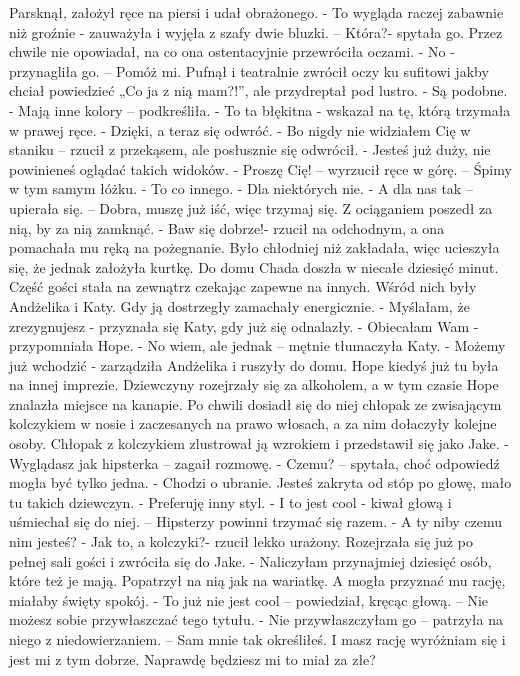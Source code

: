 \documentclass[12pt,a4paper]{book}
\begin{document}
Parsknął, założył ręce na piersi i udał obrażonego. 
- To wygląda raczej zabawnie niż groźnie - zauważyła i wyjęła z szafy dwie bluzki. – Która?- spytała go. 
Przez chwile nie opowiadał, na co ona ostentacyjnie przewróciła oczami. 
- No - przynagliła go. – Pomóż mi.
Pufnął i teatralnie zwrócił oczy ku sufitowi jakby chciał powiedzieć „Co ja z nią mam?!”, ale przydreptał pod lustro. 
- Są podobne. 
- Mają inne kolory – podkreśliła. 
- To ta błękitna - wskazał na tę, którą trzymała w prawej ręce.
- Dzięki, a teraz się odwróć.
- Bo nigdy nie widziałem Cię w staniku – rzucił z przekąsem, ale posłusznie się odwrócił. 
- Jesteś już duży, nie powinieneś oglądać takich widoków. 
- Proszę Cię! – wyrzucił ręce w górę. – Śpimy w tym samym łóżku.
- To co innego.
- Dla niektórych nie. 
- A dla nas tak – upierała się. – Dobra, muszę już iść, więc trzymaj się.
Z ociąganiem poszedł za nią, by za nią zamknąć.
- Baw się dobrze!- rzucił na odchodnym, a ona pomachała mu ręką na pożegnanie. 
Było chłodniej niż zakładała, więc ucieszyła się, że jednak założyła kurtkę. Do domu Chada doszła w niecałe dziesięć minut. Część gości stała na zewnątrz czekając zapewne na innych. Wśród nich były Andżelika i Katy. Gdy ją dostrzegły zamachały energicznie.
- Myślałam, że zrezygnujesz - przyznała się Katy, gdy już się odnalazły. 
- Obiecałam Wam - przypomniała Hope. 
- No wiem, ale jednak – mętnie tłumaczyła Katy.
- Możemy już wchodzić - zarządziła Andżelika i ruszyły do domu. 
Hope kiedyś już tu była na innej imprezie. Dziewczyny rozejrzały się za alkoholem, a w tym czasie Hope znalazła miejsce na kanapie. Po chwili dosiadł się do niej chłopak ze zwisającym kolczykiem w nosie i zaczesanych na prawo włosach, a za nim dołaczyły kolejne osoby. 
Chłopak z kolczykiem zlustrował ją wzrokiem i przedstawił się jako Jake. 
- Wyglądasz jak hipsterka – zagaił rozmowę. 
- Czemu? – spytała, choć odpowiedź mogła być tylko jedna.
- Chodzi o ubranie. Jesteś zakryta od stóp po głowę, mało tu takich dziewczyn. 
- Preferuję inny styl.
- I to jest cool - kiwał głową i uśmiechał się do niej. – Hipsterzy powinni trzymać się razem. 
- A ty niby czemu nim jesteś?
- Jak to, a kolczyki?- rzucił lekko urażony.
Rozejrzała się już po pełnej sali gości i zwróciła się do Jake.
- Naliczyłam przynajmiej dziesięć osób, które też je mają. 
Popatrzył na nią jak na wariatkę. A mogła przyznać mu rację, miałaby święty spokój. 
- To już nie jest cool – powiedział, kręcąc głową. – Nie możesz sobie przywłaszczać tego tytułu.
- Nie przywłaszczyłam go – patrzyła na niego z niedowierzaniem. – Sam mnie tak określiłeś. I masz rację wyróżniam się i jest mi z tym dobrze. Naprawdę będziesz mi to miał za złe?
\end{document}
